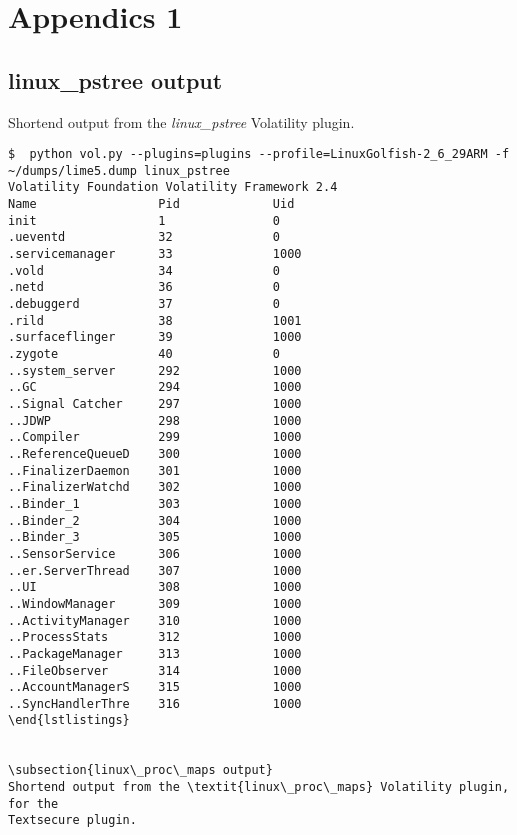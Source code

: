\section{Appendics 1}

\subsection{linux\_pstree output}
Shortend output from the \textit{linux\_pstree} Volatility plugin.
\begin{lstlisting}
$  python vol.py --plugins=plugins --profile=LinuxGolfish-2_6_29ARM -f ~/dumps/lime5.dump linux_pstree
Volatility Foundation Volatility Framework 2.4
Name                 Pid             Uid            
init                 1               0              
.ueventd             32              0              
.servicemanager      33              1000           
.vold                34              0              
.netd                36              0              
.debuggerd           37              0              
.rild                38              1001           
.surfaceflinger      39              1000           
.zygote              40              0              
..system_server      292             1000           
..GC                 294             1000           
..Signal Catcher     297             1000           
..JDWP               298             1000           
..Compiler           299             1000           
..ReferenceQueueD    300             1000           
..FinalizerDaemon    301             1000           
..FinalizerWatchd    302             1000           
..Binder_1           303             1000           
..Binder_2           304             1000           
..Binder_3           305             1000           
..SensorService      306             1000           
..er.ServerThread    307             1000           
..UI                 308             1000           
..WindowManager      309             1000           
..ActivityManager    310             1000           
..ProcessStats       312             1000           
..PackageManager     313             1000           
..FileObserver       314             1000           
..AccountManagerS    315             1000           
..SyncHandlerThre    316             1000 
\end{lstlistings}


\subsection{linux\_proc\_maps output}
Shortend output from the \textit{linux\_proc\_maps} Volatility plugin, for the
Textsecure plugin.


\end{lstlisting}
